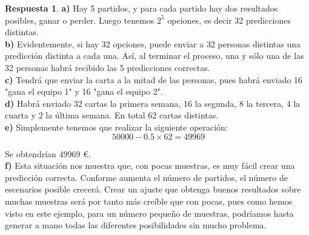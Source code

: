 \documentclass[10pt,a4paper]{article}
\theoremstyle{definition}
\newtheorem*{respuesta}{Respuesta}
\begin{document}
\begin{respuesta}
\textbf{a)}
Hay 5 partidos, y para cada partido hay dos resultados posibles, ganar o perder. Luego tenemos $2^5$ opciones, es decir 32 predicciones distintas.\\

\textbf{b)}
Evidentemente, si hay 32 opciones, puede enviar a 32 personas distintas una predicción distinta a cada una. Así, al terminar el proceso, una y sólo una de las 32 personas habrá recibido las 5 predicciones correctas.\\

\textbf{c)}
Tendrá que enviar la carta a la mitad de las personas, pues habrá enviado 16 "gana el equipo 1" y 16 "gana el equipo 2".\\

\textbf{d)}
Habrá enviado 32 cartas la primera semana, 16 la segunda, 8 la tercera, 4 la cuarta y 2 la última semana. En total 62 cartas distintas.\\

\textbf{e)}
Simplemente tenemos que realizar la siguiente operación:\\

\[
\ 50000 - 0.5 \times 62 = 49969
\]

Se obtendrían 49969 \euro.\\

\textbf{f)}
Esta situación nos muestra que, con pocas muestras, es muy fácil crear una predicción correcta. Conforme aumenta el número de partidos, el número de escenarios posible crecerá. Crear un ajuste que obtenga buenos resultados sobre muchas muestras será por tanto más creíble que con pocas, pues como hemos visto en este ejemplo, para un número pequeño de muestras, podríamos hasta generar a mano todas las diferentes posibilidades sin mucho problema.\\

\end{respuesta}
\end{document}
